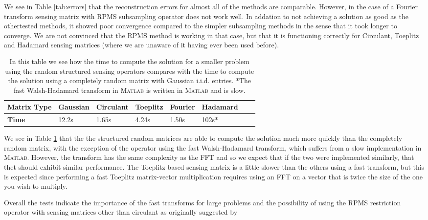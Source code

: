 We see in Table \ref{tab:errors} that the reconstruction errors for almost all
of the methods are comparable. However, in the case of a Fourier transform
sensing matrix with RPMS subsampling operator does not work well. In addation
to not achieving a solution as good as the othertested methods, it showed poor
convergence compared to the simpler subsampling methods in the sense that it
took longer to converge. We are not convinced that the RPMS method is working in
that case, but that it is functioning correctly for Circulant, Toeplitz and
Hadamard sensing matrices (where we are unaware of it having ever been used
before). 

\begin{table}[h]
\begin{tabular}{l|lllllll}
	\textbf{Matrix Type} & Gaussian & Circulant & Toeplitz & Fourier & Hadamard \\ \hline
	\textbf{Time}        & 12.2s    & 1.65s     & 4.24s    & 1.50s   & 102s*    \\
\end{tabular}
\label{tab:times}
\caption{ In this table we see how the time to compute the solution for a smaller problem using the random structured sensing operators compares with the time to compute the solution using a completely random matrix with Gaussian i.i.d. entries. *The fast Walsh-Hadamard transform in \textsc{Matlab} is written in \textsc{Matlab} and is slow.}
\end{table}


We see in Table \ref{tab:times} that the the structured random matrices are
able to compute the solution much more quickly than the completely random
matrix, with the exception of the operator using the fast Walsh-Hadamard
transform, which suffers from a slow implementation in \textsc{Matlab}. However,
the transform has the same complexity as the FFT and so we expect that if the
two were implemented similarly, that thet should exhibit similar performance.
The Toeplitz based sensing matrix is a little slower than the others using a
fast transform, but this is expected since performing a fast Toeplitz
matrix-vector multiplication requires using an FFT on a vector that is twice the
size of the one you wish to multiply. 

Overall the tests indicate the importance of the fast transforms for large
problems and the possibility of using the RPMS restriction operator with sensing
matrices other than circulant as originally suggested by
